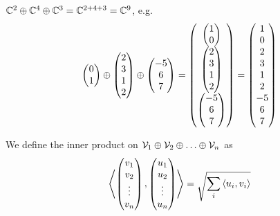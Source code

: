 \begin{example}
    $\mathbb{C}^2 \oplus \mathbb{C}^4 \oplus \mathbb{C}^3 = \mathbb{C}^{2+4+3} = \mathbb{C}^9$, e.g.
    \[\begin{pmatrix}0\\1\end{pmatrix}\oplus\begin{pmatrix}2\\3\\1\\2\\\end{pmatrix}\oplus\begin{pmatrix}-5\\6\\7\end{pmatrix} = \begin{pmatrix}\begin{pmatrix}1\\0\end{pmatrix}\\\begin{pmatrix}2\\3\\1\\2\\\end{pmatrix}\\\begin{pmatrix}-5\\6\\7\end{pmatrix}\end{pmatrix} = \begin{pmatrix}1\\0\\2\\3\\1\\2\\-5\\6\\7\end{pmatrix}\]
\end{example}

\begin{definition}
    We define the inner product on $\vecspace{V}_1 \directsum \vecspace{V}_2 \directsum \dots \directsum \vecspace{V}_n$ as
    \[\left\langle \begin{pmatrix}v_1\\v_2\\\vdots\\v_n\end{pmatrix}, \begin{pmatrix}u_1\\u_2\\\vdots\\u_n\end{pmatrix}\right\rangle = \sqrt{\sum_{i}\left\langle u_i, v_i\right\rangle}\]
\end{definition}

